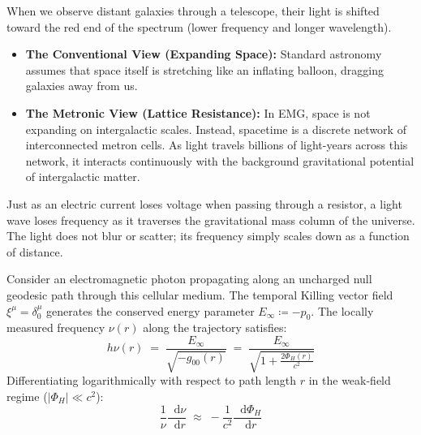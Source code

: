 \documentclass[
    12pt,
    a4paper,
    headings=normal,
    twoside=false,
    open=any,
    parskip=half
]{scrbook}
\newcommand{\diff}{\mathop{}\!\mathrm{d}}
\begin{document}
\begin{intuitionbox}
When we observe distant galaxies through a telescope, their light is shifted toward the red end of the spectrum (lower frequency and longer wavelength). 
\begin{itemize}[leftmargin=1.5em]
    \item \textbf{The Conventional View (Expanding Space):} Standard astronomy assumes that space itself is stretching like an inflating balloon, dragging galaxies away from us.
    \item \textbf{The Metronic View (Lattice Resistance):} In EMG, space is not expanding on intergalactic scales. Instead, spacetime is a discrete network of interconnected metron cells. As light travels billions of light-years across this network, it interacts continuously with the background gravitational potential of intergalactic matter.
\end{itemize}
Just as an electric current loses voltage when passing through a resistor, a light wave loses frequency as it traverses the gravitational mass column of the universe. The light does not blur or scatter; its frequency simply scales down as a function of distance.
\end{intuitionbox}

Consider an electromagnetic photon propagating along an uncharged null geodesic path through this cellular medium. The temporal Killing vector field $\xi^\mu = \delta_0^\mu$ generates the conserved energy parameter $E_\infty \coloneqq -p_0$. The locally measured frequency $\nu(r)$ along the trajectory satisfies:
\begin{equation}
h \nu(r) \;=\; \frac{E_\infty}{\sqrt{-g_{00}(r)}} \;=\; \frac{E_\infty}{\sqrt{1 + \frac{2\Phi_H(r)}{c^2}}}
\label{eq:ch7_measured_frequency}
\end{equation}
Differentiating logarithmically with respect to path length $r$ in the weak-field regime ($|\Phi_H| \ll c^2$):
\begin{equation}
\frac{1}{\nu}\frac{\diff\nu}{\diff r} \;\approx\; -\frac{1}{c^2}\frac{\diff\Phi_H}{\diff r}
\label{eq:ch7_frequency_gradient_ode}
\end{equation}
\end{document}
